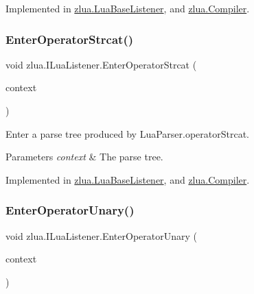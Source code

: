 Implemented in \mbox{\hyperlink{classzlua_1_1_lua_base_listener_ad21692d9754c71a80f6c0378e0697f02}{zlua.\+Lua\+Base\+Listener}}, and \mbox{\hyperlink{classzlua_1_1_compiler_a3e4509b5b2b44e581499d2264cf0e22f}{zlua.\+Compiler}}.

\mbox{\label{interfacezlua_1_1_i_lua_listener_a9fbd70b572afa004220c8cdcaceb641a}} 
\subsubsection{\texorpdfstring{Enter\+Operator\+Strcat()}{EnterOperatorStrcat()}}
{\footnotesize\ttfamily void zlua.\+I\+Lua\+Listener.\+Enter\+Operator\+Strcat (\begin{DoxyParamCaption}\item[{\mbox{[}\+Not\+Null\mbox{]} \mbox{\hyperlink{classzlua_1_1_lua_parser_1_1_operator_strcat_context}{Lua\+Parser.\+Operator\+Strcat\+Context}}}]{context }\end{DoxyParamCaption})}



Enter a parse tree produced by Lua\+Parser.\+operator\+Strcat. 


\begin{DoxyParams}{Parameters}
{\em context} & The parse tree.\\
\hline
\end{DoxyParams}


Implemented in \mbox{\hyperlink{classzlua_1_1_lua_base_listener_a3bcff2132c345b7cc97fd7782d4f6463}{zlua.\+Lua\+Base\+Listener}}, and \mbox{\hyperlink{classzlua_1_1_compiler_a9e79fbc0bd20b36c90d0b53569a1f7d7}{zlua.\+Compiler}}.

\mbox{\label{interfacezlua_1_1_i_lua_listener_a7b7f6eceb594a19cd7ee783bdb209c8e}} 
\subsubsection{\texorpdfstring{Enter\+Operator\+Unary()}{EnterOperatorUnary()}}
{\footnotesize\ttfamily void zlua.\+I\+Lua\+Listener.\+Enter\+Operator\+Unary (\begin{DoxyParamCaption}\item[{\mbox{[}\+Not\+Null\mbox{]} \mbox{\hyperlink{classzlua_1_1_lua_parser_1_1_operator_unary_context}{Lua\+Parser.\+Operator\+Unary\+Context}}}]{context }\end{DoxyParamCaption})}



